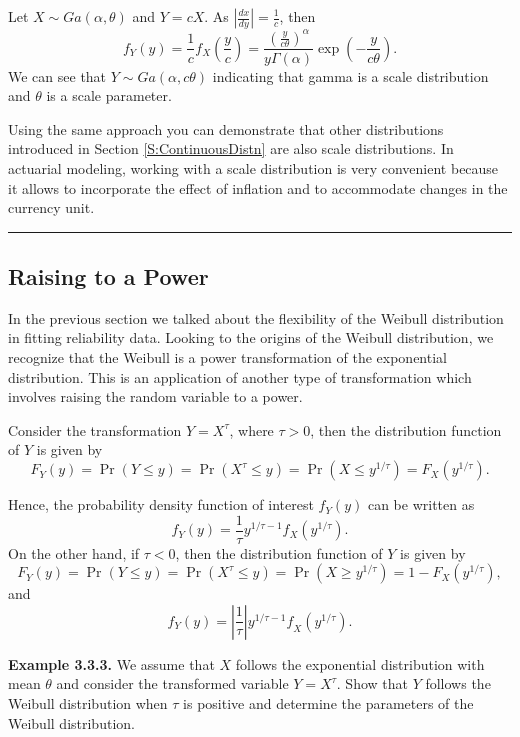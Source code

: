 \documentclass[]{book}
\theoremstyle{definition}
\theoremstyle{definition}
\theoremstyle{definition}
\theoremstyle{remark}
\begin{document}
Let \(X\sim Ga(\alpha,\theta)\) and \(Y = cX\). As
\(\left| \frac{dx}{dy} \right| = \frac{1}{c}\), then
\[f_{Y}\left( y \right) = \frac{1}{c}f_{X}\left( \frac{y}{c} \right) = \frac{\left( \frac{y}{c\theta} \right)^{\alpha}}{y\Gamma\left( \alpha \right)}\exp \left( - \frac{y}{c\theta} \right)  .\]
We can see that \(Y\sim Ga(\alpha,c\theta)\) indicating that gamma is a
scale distribution and \(\theta\) is a scale parameter.

Using the same approach you can demonstrate that other distributions
introduced in Section \ref{S:ContinuousDistn} are also scale
distributions. In actuarial modeling, working with a scale distribution
is very convenient because it allows to incorporate the effect of
inflation and to accommodate changes in the currency unit.

\begin{center}\rule{0.5\linewidth}{\linethickness}\end{center}

\subsection{Raising to a Power}\label{raising-to-a-power}

In the previous section we talked about the flexibility of the Weibull
distribution in fitting reliability data. Looking to the origins of the
Weibull distribution, we recognize that the Weibull is a power
transformation of the exponential distribution. This is an application
of another type of transformation which involves raising the random
variable to a power.

Consider the transformation \(Y = X^{\tau}\), where \(\tau > 0\), then
the distribution function of \(Y\) is given by
\[F_{Y}\left( y \right) = \Pr\left( Y \leq y \right) = \Pr\left( X^{\tau} \leq y \right) = \Pr\left( X \leq y^{1/ \tau} \right) = F_{X}\left( y^{1/ \tau} \right).\]

Hence, the probability density function of interest \(f_{Y}(y)\) can be
written as
\[f_{Y}(y) = \frac{1}{\tau} y^{1/ \tau - 1} f_{X}\left( y^{1/ \tau} \right).\]
On the other hand, if \(\tau < 0\), then the distribution function of
\(Y\) is given by
\[F_{Y}\left( y \right) = \Pr\left( Y \leq y \right) = \Pr\left( X^{\tau} \leq y \right) = \Pr\left( X \geq y^{1/ \tau} \right) = 1 - F_{X}\left( y^{1/ \tau} \right), \]
and
\[f_{Y}(y) = \left| \frac{1}{\tau} \right|{y^{1/ \tau - 1}f}_{X}\left( y^{1/ \tau} \right).\]

\textbf{Example 3.3.3.} We assume that \(X\) follows the exponential
distribution with mean \(\theta\) and consider the transformed variable
\(Y = X^{\tau}\). Show that \(Y\) follows the Weibull distribution when
\(\tau\) is positive and determine the parameters of the Weibull
distribution.
\end{document}

